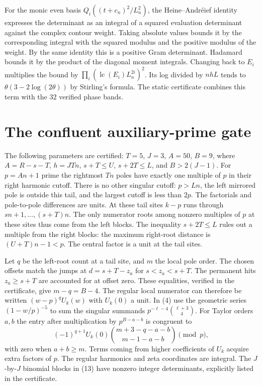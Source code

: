 \IfFileExists{TS1cmr.fd}{\documentclass[11pt]{article}}
\newcommand{\GateA}{50}
\newcommand{\TT}{5}
\newcommand{\JJ}{3}
\newcommand{\BB}{9}
\newcommand{\phaseBins}{32}
\begin{document}
For the monic even basis \(Q_i((t+c_n)^2/L_n^2)\), the
Heine--Andr\'eief identity expresses the determinant as an
integral of a squared evaluation determinant against the
complex contour weight. Taking absolute values bounds it by
the corresponding integral with the squared modulus and
the positive modulus of the weight. By the same identity
this is a positive Gram determinant. Hadamard bounds it by
the product of the diagonal moment integrals.
Changing back to \(E_i\) multiplies the bound by
\(\prod_i(\operatorname{lc}(E_i)L_n^{2i})^2\).
Its log divided by \(nhL\) tends to
\(\theta(3-2\log(2\theta))\) by Stirling's formula. The
static certificate combines this term with the
\(\phaseBins\) verified phase bands.

\section{The confluent auxiliary-prime gate}
The following parameters are certified:
\(T=\TT\), \(J=\JJ\), \(A=\GateA\), \(B=\BB\),
where \(A=R-s-T\), \(h=JTn\), \(s+T\le U\),
\(s+2T\le L\), and \(B>2(J-1)\).
For \(p=An+1\) prime the rightmost \(Tn\) poles have exactly one
multiple of \(p\) in their right harmonic cutoff. There is no
other singular cutoff: \(p>Ln\), the left mirrored pole
is outside this tail, and the largest cutoff is less than \(2p\).
The factorials and pole-to-pole differences are units.
At these tail sites \(k-p\) runs through \(sn+1,\ldots,(s+T)n\).
The only numerator roots among nonzero multiples of \(p\)
at these sites thus come from the left blocks. The inequality
\(s+2T\le L\) rules out a multiple from the right blocks:
the maximum right-root distance is \((U+T)n-1<p\).
The central factor is a unit at the tail sites.

Let \(q\) be the left-root count at a tail site, and \(m\)
the local pole order. The chosen offsets match the jumps at
\(d=s+T-z_a\) for \(s<z_a<s+T\). The permanent hits \(z_a\ge s+T\)
are accounted for at offset zero. These equalities, verified
in the certificate, give \(m-q=B-4\).
The regular local numerator can therefore be written
\((w-p)^q U_k(w)\) with \(U_k(0)\) a unit. In (4) use the
geometric series \((1-w/p)^{-5}\) to sum the singular
summands \(p^{-\ell-4}\binom{\ell+3}{4}\).
For Taylor orders \(a,b\) the entry after multiplication by
\(p^{B-a-b}\) is congruent to
\[
 (-1)^{q+1}U_k(0)
       \binom{m+3-q-a-b}{m-1-a-b}\pmod p,
 \tag{13}
\]
with zero when \(a+b\ge m\). Terms coming from higher
coefficients of \(U_k\) acquire extra factors of \(p\).
The regular harmonics and zeta coordinates are integral.
The \(J\)-by-\(J\) binomial blocks in (13) have nonzero
integer determinants, explicitly listed in the certificate.
\end{document}
